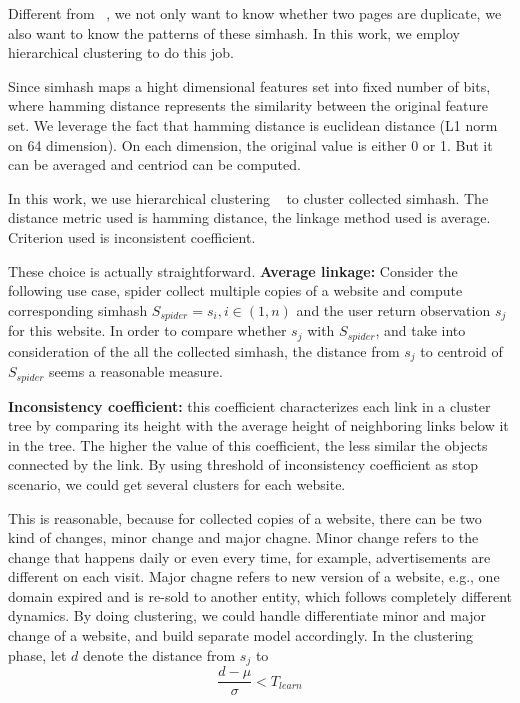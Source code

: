 Different from ~\cite{manku2007detecting}, we not only want to know whether two pages are
duplicate, we also want to know the patterns of these simhash. In this work, we employ
hierarchical clustering to do this job.

Since simhash maps a hight dimensional
features set into fixed number of bits, where hamming distance represents the
similarity between the original feature set. We leverage the fact that hamming
distance is euclidean distance (L1 norm on 64 dimension). On each dimension, the
original value is either 0 or 1. But it can be averaged and centriod can be
computed.

In this work, we use hierarchical clustering ~\cite{jones2014scipy} to cluster
collected simhash. The distance metric used is hamming distance, the linkage
method used is average. Criterion used is inconsistent coefficient.

These choice is actually straightforward. {\bf Average linkage:} 
Consider the following use case, spider collect
multiple copies of a website and compute corresponding simhash $S_{spider} = s_{i}, i \in
(1,n)$ and the user return observation $s_{j}$ for this website. In order to
compare whether $s_{j}$ with $S_{spider}$, and take into consideration of the all the
collected simhash, the distance from $s_{j}$ to centroid of $S_{spider}$ seems a
reasonable measure. 

{\bf Inconsistency coefficient:} this coefficient characterizes each link in a cluster tree by
comparing its height with the average height of neighboring links
below it in the tree. The higher the value of this coefficient, the less similar the
objects connected by the link. By using threshold of inconsistency
coefficient as stop scenario, we could get several clusters for each website.

This is reasonable, because for collected copies of a website, there can be two
kind of changes, minor change and major chagne. Minor change refers to the
change that happens daily or even every time, for example, advertisements are
different on each visit. Major chagne refers to new version of a website, e.g.,
one domain expired and is re-sold to another entity, which follows 
completely different dynamics. By doing clustering, we could handle
differentiate minor and major change of a website, and build separate model
accordingly. In the clustering phase, let $d$ denote the distance from $s_{j}$
to 
\begin{equation}
  \label{coefficient:learn}
  \frac{d - \mu}{\sigma} < T_{learn}
\end{equation}




